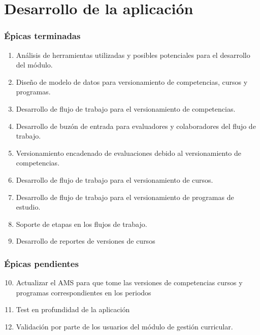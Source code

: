 \chapter{Desarrollo de la aplicación} %
\label{capitulo6} %

\subsection*{Épicas terminadas}
\begin{enumerate}
	\item Análisis de herramientas utilizadas y posibles potenciales para el desarrollo del módulo.
	\item Diseño de modelo de datos para versionamiento de competencias, cursos y programas.
	\item Desarrollo de flujo de trabajo para el versionamiento de competencias.
	\item Desarrollo de buzón de entrada para evaluadores y colaboradores del flujo de trabajo.
	\item Versionamiento encadenado de evaluaciones debido al versionamiento de competencias.
	\item Desarrollo de flujo de trabajo para el versionamiento de cursos.
	\item Desarrollo de flujo de trabajo para el versionamiento de programas de estudio.
 	\item Soporte de etapas en los flujos de trabajo.
	\item Desarrollo de reportes de versiones de cursos
\end{enumerate}

\subsection*{Épicas pendientes}
\begin{enumerate}
 	\setcounter{enumi}{9}
	\item Actualizar el AMS para que tome las versiones de competencias cursos y programas correspondientes en los periodos
	\item Test en profundidad de la aplicación
	\item Validación por parte de los usuarios del módulo de gestión curricular.
\end{enumerate}

